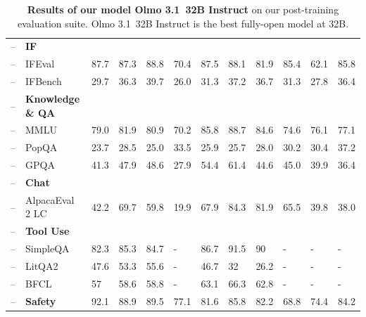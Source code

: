 \documentclass[table]{ai2style/ai2}
\newcommand{\metric}[1]{\hspace{0.7em}#1}
\begin{document}
{{\begin{table}[t]
{{\begin{NiceTabular}{@{}Hl
C{35pt}C{35pt}P{35pt}|
C{35pt}C{35pt}C{35pt}C{35pt}C{35pt}C{35pt}C{35pt}@{}}
 -- & \textbf{IF} & & & & & & & & & & \\
 -- & \metric{IFEval} & 87.7 & 87.3 & 88.8 & 70.4 & 87.5 & 88.1 & 81.9 & 85.4 & 62.1 & 85.8 \\
 -- & \metric{IFBench} & 29.7 & 36.3 & 39.7 & 26.0 & 31.3 & 37.2 & 36.7 & 31.3 & 27.8 & 36.4 \\
\midrule

 -- & \textbf{Knowledge \& QA} & & & & & & & & & & \\
 -- & \metric{MMLU} & 79.0 & 81.9 & 80.9 & 70.2 & 85.8 & 88.7 & 84.6 & 74.6 & 76.1 & 77.1 \\
 -- & \metric{PopQA} & 23.7 & 28.5 & 25.0 & 33.5 & 25.9 & 25.7 & 28.0 & 30.2 & 30.4 & 37.2 \\
 -- & \metric{GPQA} & 41.3 & 47.9 & 48.6 & 27.9 & 54.4 & 61.4 & 44.6 & 45.0 & 39.9 & 36.4 \\
\midrule

 -- & \textbf{Chat} & & & & & & & & & & \\
 -- & \metric{AlpacaEval 2 LC} & 42.2 & 69.7 & 59.8 & 19.9 & 67.9 & 84.3 & 81.9 & 65.5 & 39.8 & 38.0 \\
\midrule

 -- & \textbf{Tool Use} & & & & & & & & & \\
 -- & \metric{SimpleQA} & 82.3 & 85.3 & 84.7 & - & 86.7 & 91.5 & 90 & - & - & - \\
 -- & \metric{LitQA2} & 47.6 & 53.3 & 55.6 & - & 46.7 & 32 & 26.2 & - & - & - \\
 -- & \metric{BFCL} & 57 & 58.6 & 58.8 & - & 63.1 & 66.3 & 62.8 & - & - & -  \\
\midrule

 -- & \textbf{Safety} & 92.1 & 88.9 & 89.5 & 77.1 & 81.6 & 85.8 & 82.2 & 68.8 & 74.4 & 84.2 \\
\bottomrule

\end{NiceTabular}}}
\caption{\textbf{Results of our model Olmo 3.1~32B Instruct} on our post-training evaluation suite. Olmo 3.1~32B Instruct is the best fully-open model at 32B. 
}
\label{tab:32b-instruct-baeslines}
\end{table}

}}
\end{document}
